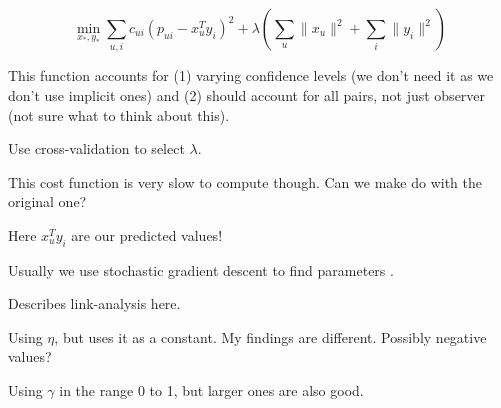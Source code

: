 \begin{equation}
    \min_{x_*, y_*} \sum_{u,i} c_{ui} (p_{ui} - x_{u}^T y_i)^2 + \lambda(\sum_{u} \|x_u\|^2 + \sum_{i} \|y_i\|^2)
\end{equation}

This function accounts for (1) varying confidence levels (we don't need it as we don't use implicit ones) and (2) should account for all pairs, not just observer (not sure what to think about this).

Use cross-validation to select $\lambda$.

This cost function is very slow to compute though. Can we make do with the original one?

Here $x_{u}^T y_i$ are our predicted values!

Usually we use stochastic gradient descent to find parameters \cite{hu2008collaborative}.

Describes link-analysis here.


Using $\eta$, but uses it as a constant. My findings are different. Possibly negative values?

Using $\gamma$ in the range 0 to 1, but larger ones are also good.


